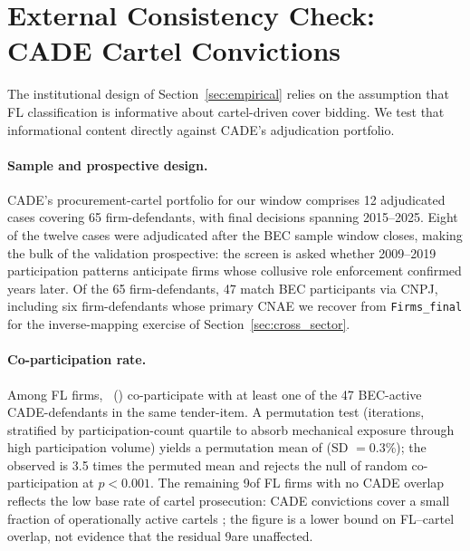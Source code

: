 \section{External Consistency Check: CADE Cartel Convictions}
\label{sec:cade}

The institutional design of Section~\ref{sec:empirical} relies on
the assumption that FL classification is informative about
cartel-driven cover bidding. We test that informational content
directly against CADE's adjudication portfolio.

\paragraph{Sample and prospective design.}
CADE's procurement-cartel portfolio for our window comprises 12
adjudicated cases covering 65 firm-defendants, with final
decisions spanning 2015--2025. Eight of the twelve cases were
adjudicated after the BEC sample window closes, making the bulk
of the validation prospective: the screen is asked whether
2009--2019 participation patterns anticipate firms whose
collusive role enforcement confirmed years later. Of the 65
firm-defendants, 47 match BEC participants via CNPJ, including
six firm-defendants whose primary CNAE we recover from
\texttt{Firms\_final} for the inverse-mapping exercise of
Section~\ref{sec:cross_sector}.

\paragraph{Co-participation rate.}
Among \valFL FL firms, \valCobidders\ (\valCobidShareFL) co-participate with at
least one of the 47 BEC-active CADE-defendants in the same
tender-item. A permutation test (\valPermPilot iterations, stratified
by participation-count quartile to absorb mechanical exposure
through high participation volume) yields a permutation mean of
\valCADEbase (SD $= 0.3$\%); the observed \valCobidShareFL is 3.5 times the
permuted mean and rejects the null of random co-participation
at $p < 0.001$. The remaining 9\valCADEbase of FL firms with no CADE
overlap reflects the low base rate of cartel prosecution: CADE
convictions cover a small fraction of operationally active
cartels \citep{connor2007price}; the \valCobidShareFL figure is a lower
bound on FL--cartel overlap, not evidence that the residual
9\valCADEbase are unaffected.

